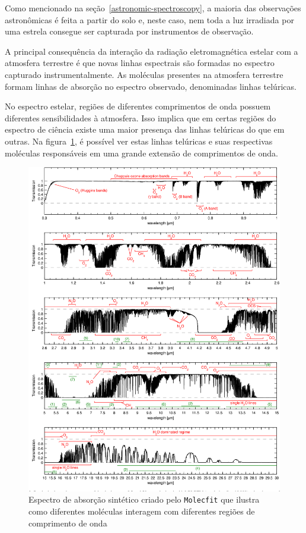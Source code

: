 Como mencionado na seção~\ref{astronomic-spectroscopy}, a maioria das observações astronômicas é feita a partir do solo e, neste caso, nem toda a luz irradiada por uma estrela consegue ser capturada por instrumentos de observação. 

A principal consequência da interação da radiação eletromagnética estelar com a atmosfera terrestre é que novas linhas espectrais são formadas no espectro capturado instrumentalmente. As moléculas presentes na atmosfera terrestre formam linhas de absorção no espectro observado, denominadas linhas telúricas.  

No espectro estelar, regiões de diferentes comprimentos de onda possuem diferentes sensibilidades à atmosfera. Isso implica que em certas regiões do espectro de ciência existe uma maior presença das linhas telúricas do que em outras. Na figura~\ref{fig:molectfit-telluric-reference}, é possível ver estas linhas telúricas e suas respectivas moléculas responsáveis em uma grande extensão de comprimentos de onda.

\begin{figure}[!htb]
\centering
\includegraphics[width=15cm, trim=0 10 0 0, clip]{figuras/telluric_reference_molecfit.png}
\caption{Espectro de absorção sintético criado pelo \texttt{Molecfit} que ilustra como diferentes moléculas interagem com diferentes regiões de comprimento de onda \citep{smette2015molecfit}}
\label{fig:molectfit-telluric-reference}
\end{figure}

